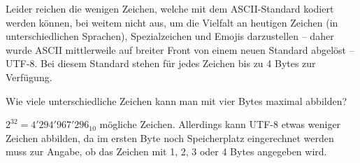Leider reichen die wenigen Zeichen, welche mit dem \gls{ASCII}-Standard kodiert werden können, bei weitem nicht aus, um die Vielfalt an heutigen Zeichen (in unterschiedlichen Sprachen), Spezialzeichen und Emojis darzustellen -- daher wurde \gls{ASCII} mittlerweile auf breiter Front von einem neuen Standard abgelöst -- \gls{UTF-8}. Bei diesem Standard stehen für jedes Zeichen bis zu 4 Bytes zur Verfügung.
\begin{myexercise}
	Wie viele unterschiedliche Zeichen kann man mit vier Bytes maximal abbilden?
	\begin{myanswer}
		$2^{32}=4'294'967'296_{10}$ mögliche Zeichen. Allerdings kann UTF-8 etwas weniger Zeichen abbilden, da im ersten Byte noch Speicherplatz eingerechnet werden muss zur Angabe, ob das Zeichen mit 1, 2, 3 oder 4 Bytes angegeben wird.
	\end{myanswer}
\end{myexercise}


\clearpage

